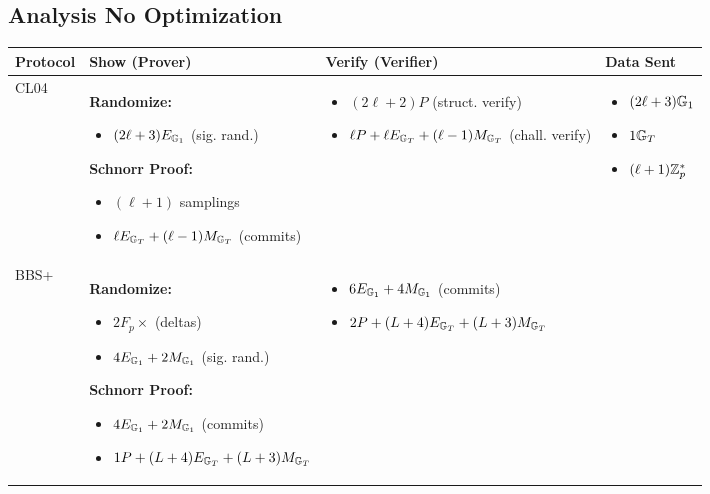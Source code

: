 {\newpage
\subsection{Analysis No Optimization}
\begin{tabular}{|l|p{4.5cm}|p{4.5cm}|p{3.5cm}|}
    \hline
    \textbf{Protocol} & \textbf{Show (Prover)} & \textbf{Verify (Verifier)} & \textbf{Data Sent} \\
    \hline
    CL04 &
    \textbf{Randomize:}
    \begin{itemize}[nosep]
        \item $(2\ell + 3)E_{\mathbb{G}_1}$ (sig. rand.)
    \end{itemize}
    \textbf{Schnorr Proof:}
    \begin{itemize}[nosep]
        \item $(\ell+1)$ samplings
        \item $\ell E_{\mathbb{G}_T} + (\ell-1)M_{\mathbb{G}_T}$ (commits)
    \end{itemize}
    &
    \begin{itemize}[nosep]
        \item $(2\ell + 2)P$ (struct. verify)
        \item $\ell P + \ell E_{\mathbb{G}_T} + (\ell-1)M_{\mathbb{G}_T}$ (chall. verify)
    \end{itemize}
    &
    \begin{itemize}[nosep]
        \item $(2\ell + 3)\mathbb{G}_1$
        \item $1\mathbb{G}_T$
        \item $(\ell + 1)\mathbb{Z}_p^*$
    \end{itemize}
    \\
    \hline
    BBS+ &
    \textbf{Randomize:}
    \begin{itemize}[nosep]
        \item $2F_p\times$ (deltas)
        \item $4E_{\mathbb{G}_1} + 2M_{\mathbb{G}_1}$ (sig. rand.)
    \end{itemize}
    \textbf{Schnorr Proof:}
    \begin{itemize}[nosep]
        \item $4E_{\mathbb{G}_1} + 2M_{\mathbb{G}_1}$ (commits)
        \item $1P + (L+4)E_{\mathbb{G}_T} + (L+3)M_{\mathbb{G}_T}$
    \end{itemize}
    &
    \begin{itemize}[nosep]
        \item $6E_{\mathbb{G}_1} + 4M_{\mathbb{G}_1}$ (commits)
        \item $2P + (L+4)E_{\mathbb{G}_T} + (L+3)M_{\mathbb{G}_T}$

\end{itemize}
\end{tabular}}
